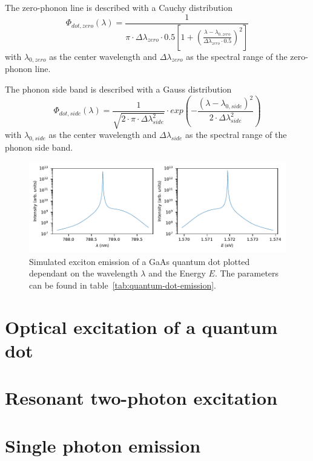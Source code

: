The zero-phonon line is described with a Cauchy distribution
\begin{equation}
\Phi_{dot,zero}(\lambda) = \frac{1}{\pi \cdot \Delta\lambda_{zero} \cdot 0.5 \left[1+\left(\frac{\lambda - \lambda_{0, zero}}{\Delta\lambda_{zero} \cdot 0.5}\right)^2\right]}
\end{equation}
with $\lambda_{0, zero}$ as the center wavelength and $\Delta\lambda_{zero}$ as the spectral range of the zero-phonon line.

The phonon side band is described with a Gauss distribution
\begin{equation}
\Phi_{dot,side}(\lambda) = \frac{1}{\sqrt{2\cdot\pi\cdot \Delta\lambda_{side}^2}}\cdot exp\left(-\frac{(\lambda - \lambda_{0, side})^2}{2\cdot \Delta\lambda_{side}^2}\right)
\end{equation}
with $\lambda_{0, side}$ as the center wavelength and $\Delta\lambda_{side}$ as the spectral range of the phonon side band.

\begin{figure}[H]
	\centering
	\includegraphics{figures/fabry-perot/plots/quantum_dot_emission_wavelength_energy}
	\caption[Simulated exciton emission of a GaAs quantum dot]{Simulated exciton emission of a GaAs quantum dot plotted dependant on the wavelength $\lambda$ and the Energy $E$.
		The parameters can be found in table~\ref{tab:quantum-dot-emission}.}
	\label{fig:quantumdotemissionwavelengthenergy}
\end{figure}


\section{Optical excitation of a quantum dot}

\section{Resonant two-photon excitation}

\section{Single photon emission}






